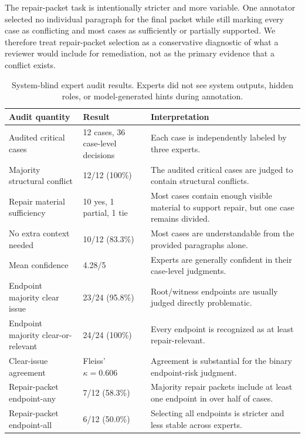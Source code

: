 \documentclass[11pt]{article}
\begin{document}
The repair-packet task is intentionally stricter and more variable.  One annotator selected no individual paragraph for the final packet while still marking every case as conflicting and most cases as sufficiently or partially supported.  We therefore treat repair-packet selection as a conservative diagnostic of what a reviewer would include for remediation, not as the primary evidence that a conflict exists.

\begin{table}[t]
\centering
\small
\setlength{\tabcolsep}{4pt}
\begin{tabular}{p{}p{}p{}}
\toprule
Audit quantity & Result & Interpretation \\
\midrule
Audited critical cases & 12 cases, 36 case-level decisions & Each case is independently labeled by three experts. \\
Majority structural conflict & 12/12 (100\%) & The audited critical cases are judged to contain structural conflicts. \\
Repair material sufficiency & 10 yes, 1 partial, 1 tie & Most cases contain enough visible material to support repair, but one case remains divided. \\
No extra context needed & 10/12 (83.3\%) & Most cases are understandable from the provided paragraphs alone. \\
Mean confidence & 4.28/5 & Experts are generally confident in their case-level judgments. \\
Endpoint majority clear issue & 23/24 (95.8\%) & Root/witness endpoints are usually judged directly problematic. \\
Endpoint majority clear-or-relevant & 24/24 (100\%) & Every endpoint is recognized as at least repair-relevant. \\
Clear-issue agreement & Fleiss' $\kappa=0.606$ & Agreement is substantial for the binary endpoint-risk judgment. \\
Repair-packet endpoint-any & 7/12 (58.3\%) & Majority repair packets include at least one endpoint in over half of cases. \\
Repair-packet endpoint-all & 6/12 (50.0\%) & Selecting all endpoints is stricter and less stable across experts. \\
\bottomrule
\end{tabular}
\caption{System-blind expert audit results.  Experts did not see system outputs, hidden roles, or model-generated hints during annotation.}
\label{tab:expert_audit_results}
\end{table}
\end{document}
